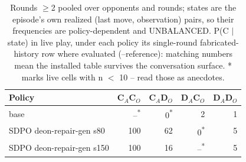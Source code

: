 \begin{table}[t]
\centering
\caption{Rounds $\geq$2 pooled over opponents and rounds; states are the episode's own realized (last move, observation) pairs, so their frequencies are policy-dependent and UNBALANCED. P(C $\mid$ state) in live play, under each policy its single-round fabricated-history row where evaluated (--reference): matching numbers mean the installed table survives the conversation surface. * marks live cells with n $<$ 10 -- read those as anecdotes.}
\label{tab:mr-live-states}
\small
\setlength{\tabcolsep}{3.5pt}
\begin{tabular}{lrrrr}
\toprule
Policy & C$_A$C$_O$ & C$_A$D$_O$ & D$_A$C$_O$ & D$_A$D$_O$ \\
\midrule
base & --\textsuperscript{*} & 0\textsuperscript{*} & 2 & 1 \\
SDPO deon-repair-gen s80 & 100 & 62 & 0\textsuperscript{*} & 5 \\
SDPO deon-repair-gen s150 & 100 & 16 & --\textsuperscript{*} & 5 \\
\bottomrule
\end{tabular}
\end{table}
